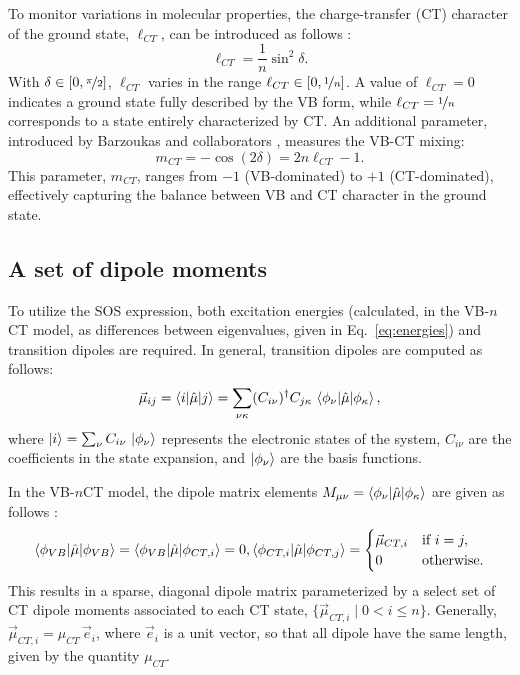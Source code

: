 \documentclass[12pt,a4paper]{article}
\begin{document}
To monitor variations in molecular properties, the charge-transfer (CT) character of the ground state, $\ell_{CT}$, can be introduced as follows \cite{choNonlinearOpticalProperties2002,choElementaryDescriptionNonlinear1998,yangLargeOffDiagonalContribution2003}:
\begin{equation}
	\ell_{CT} = \frac{1}{n} \sin^2 \delta.
\end{equation}
With $\delta \in [0, \nicefrac{\pi}{2}]$, $\ell_{CT}$ varies in the range $\ell_{CT} \in [0, \nicefrac{1}{n}]$. A value of $\ell_{CT} = 0$ indicates a ground state fully described by the VB form, while $\ell_{CT} = \nicefrac{1}{n}$ corresponds to a state entirely characterized by CT. 
An additional parameter, introduced by Barzoukas and collaborators \cite{barzoukasTWOFORMDESCRIPTIONPUSHPULL1996,barzoukasTwostateDescriptionHyper1996,blanchard-desceTwoformTwostateAnalysis1998a}, measures the VB-CT mixing:
\begin{equation}
	m_{CT} = -\cos(2\delta) = 2n \ell_{CT} - 1.
\end{equation} 
This parameter, $m_{CT}$, ranges from $-1$ (VB-dominated) to $+1$ (CT-dominated), effectively capturing the balance between VB and CT character in the ground state.

\subsection{A set of dipole moments}\label{sec:dipoles}

To utilize the SOS expression, both excitation energies (calculated, in the VB-$n$CT model, as differences between eigenvalues, given in Eq.~\eqref{eq:energies}) and transition dipoles are required. In general, transition dipoles are computed as follows:
\begin{equation}
	\vec{\mu}_{ij} = \braket{i | \hat{\mu} | j} = \sum_{\nu \kappa} (C_{i \nu})^\dagger C_{j \kappa} \, \braket{\phi_\nu | \hat{\mu} | \phi_\kappa},
\end{equation}
where $\ket{i} = \sum_\nu C_{i \nu} \, \ket{\phi_\nu}$ represents the electronic states of the system, $C_{i \nu}$ are the coefficients in the state expansion, and $\ket{\phi_\nu}$ are the basis functions. 

In the VB-$n$CT model, the dipole matrix elements $M_{\mu \nu} = \braket{\phi_\nu | \hat{\mu} | \phi_\kappa}$ are given as follows \cite{luValenceBondChargeTransferModel1994}:
\begin{align}
	\braket{\phi_{VB} | \hat{\mu} | \phi_{VB}} = \braket{\phi_{VB} | \hat{\mu} | \phi_{CT,i}} = 0,
	\braket{\phi_{CT,i} | \hat{\mu} | \phi_{CT,j}} = 
	\begin{cases}
		\vec{\mu}_{CT,i} & \text{if } i = j, \\
		0 & \text{otherwise}.
	\end{cases}
\end{align}
This results in a sparse, diagonal dipole matrix parameterized by a select set of CT dipole moments associated to each CT state, $\{\vec{\mu}_{CT,i} \mid 0 < i \leq n\}$. Generally, $\vec\mu_{CT, i} = \mu_{CT}\,\vec{e}_i$, where $\vec  e_i$ is a unit vector, so that all dipole have the same length, given by the quantity $\mu_{CT}$.
\end{document}
